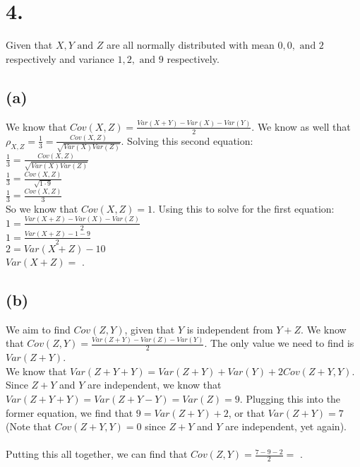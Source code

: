 \documentclass{article}
\begin{document}
\section*{4.}
{\Large 

Given that $X,Y\text{ and } Z$ are all normally distributed with mean $0,0,\text{ and } 2$ respectively and variance $1,2,\text{ and } 9$ respectively.

\subsection*{(a)}
We know that $Cov(X,Z) = \frac{Var(X + Y) - Var(X) - Var(Y)}{2}$. We know as well that $\rho_{X, Z} = \frac{1}{3} = \frac{Cov(X, Z)}{\sqrt{Var(X)Var(Z)}}$. Solving this second equation: \\
$\frac{1}{3} = \frac{Cov(X,Z)}{\sqrt{Var(X)Var(Z)}}$ \\
$\frac{1}{3} = \frac{Cov(X,Z)}{\sqrt{1 \cdot 9}}$ \\
$\frac{1}{3} = \frac{Cov(X,Z)}{3}$ \\
So we know that $Cov(X, Z) = 1$. Using this to solve for the first equation: \\
$1 = \frac{Var(X + Z) - Var(X) - Var(Z)}{2}$ \\
$1 = \frac{Var(X + Z) - 1 - 9}{2}$ \\
$2 = Var(X + Z) - 10$ \\
$Var(X + Z) = $ .

\subsection*{(b)}
We aim to find $Cov(Z, Y)$, given that $Y$ is independent from $Y + Z$. We know that $Cov(Z, Y) = \frac{Var(Z + Y) - Var(Z) - Var(Y)}{2}$. The only value we need to find is $Var(Z+Y)$. \\
We know that $Var(Z + Y + Y) = Var(Z + Y) + Var(Y) + 2Cov(Z + Y, Y)$. Since $Z+Y$ and $Y$ are independent, we know that $Var(Z + Y + Y) = Var(Z + Y - Y) = Var(Z) = 9$. Plugging this into the former equation, we find that $9 = Var(Z+Y) + 2$, or that $Var(Z + Y) = 7$ (Note that $Cov(Z+Y, Y) = 0$ since $Z+Y$ and $Y$ are independent, yet again). \\ \\
Putting this all together, we can find that $Cov(Z, Y) = \frac{7 - 9 - 2}{2} = $ .

}
\end{document}
